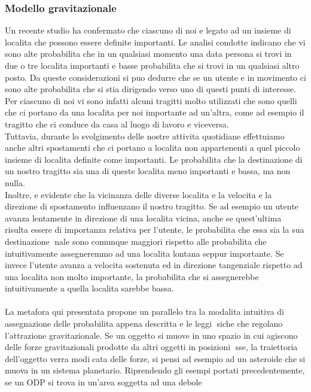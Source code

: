 \subsubsection{Modello gravitazionale}
Un recente studio \cite{cit_44} ha confermato che ciascuno di noi e legato ad un
insieme di localita che possono essere definite importanti. Le analisi condotte
indicano che vi sono alte probabilita che in un qualsiasi momento una data
persona si trovi in due o tre localita importanti e basse probabilita che si trovi
in un qualsiasi altro posto. Da queste considerazioni si puo dedurre che se un
utente e in movimento ci sono alte probabilita che si stia dirigendo verso uno
di questi punti di interesse. Per ciascuno di noi vi sono infatti alcuni tragitti
molto utilizzati che sono quelli che ci portano da una localita per noi importante
ad un'altra, come ad esempio il tragitto che ci conduce da casa al luogo
di lavoro e viceversa.\\
Tuttavia, durante lo svolgimento delle nostre attivita quotidiane effettuiamo
anche altri spostamenti che ci portano a localita non appartenenti a quel piccolo
insieme di localita definite come importanti. Le probabilita che la destinazione
di un nostro tragitto sia una di queste localita meno importanti e bassa, ma
non nulla.\\
Inoltre, e evidente che la vicinanza delle diverse localita e la velocita e la direzione
di spostamento influenzano il nostro tragitto. Se ad esempio un utente
avanza lentamente in direzione di una localita vicina, anche se quest'ultima
risulta essere di importanza relativa per l'utente, le probabilita che essa sia la
sua destinazione nale sono comunque maggiori rispetto alle probabilita che
intuitivamente assegneremmo ad una localita lontana seppur importante. Se
invece l'utente avanza a velocita sostenuta ed in direzione tangenziale rispetto
ad una localita non molto importante, la probabilita che si assegnerebbe
intuitivamente a quella localita sarebbe bassa.\\
\\
La metafora qui presentata propone un parallelo tra la modalita intuitiva
di assegnazione delle probabilita appena descritta e le leggi siche che regolano
l'attrazione gravitazionale. Se un oggetto si muove in uno spazio in cui agiscono
delle forze gravitazionali prodotte da altri oggetti in posizioni sse, la
traiettoria dell'oggetto verra modicata delle forze, si pensi ad esempio ad un
asteroide che si muova in un sistema planetario. Riprendendo gli esempi portati
precedentemente, se un ODP si trova in un'area soggetta ad una debole
